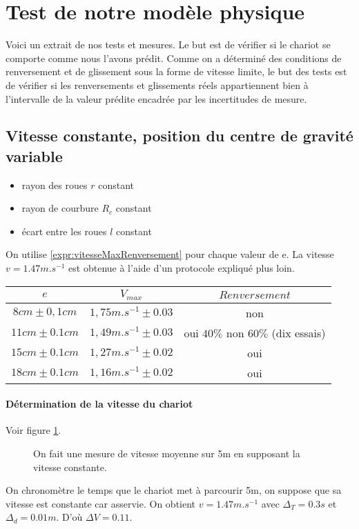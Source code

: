 \section{Test de notre modèle physique}
Voici un extrait de nos tests et mesures. Le but est de vérifier si le chariot se comporte comme nous l'avons prédit. Comme on a déterminé des conditions de renversement et de glissement sous la forme de vitesse limite, le but des tests est de vérifier si les renversements et glissements réels appartiennent bien à l'intervalle de la valeur prédite encadrée par les incertitudes de mesure.
\subsection{Vitesse constante, position du centre de gravité variable}
\begin{itemize}
	\item rayon des roues $r$ constant
	\item rayon de courbure $R_c$ constant
	\item écart entre les roues $l$ constant
\end{itemize}
On utilise \ref{expr:vitesseMaxRenversement} pour chaque valeur de e. La vitesse $v=1.47m.s^{-1}$ est obtenue à l'aide d'un protocole expliqué plus loin.\\
\begin{tabular}{c|c|c}
	$e$ & $V_{max}$ & $Renversement$\\
	\hline \hline
	$8cm\pm 0,1cm$ & $1,75m.s^{-1} \pm 0.03$ & non\\
	$11cm\pm 0.1cm$ & $1,49m.s^{-1} \pm 0.03$ & oui $40\%$ non $60\%$ (dix essais)\\
	$15cm\pm 0.1cm$ & $1,27m.s^{-1} \pm 0.02$ & oui\\
	$18cm\pm 0.1cm$ & $1,16m.s^{-1} \pm 0.02$ & oui
\end{tabular}
\paragraph{Détermination de la vitesse du chariot}
Voir figure \ref{fig:chariotChrono}.
\begin{figure}
	\centering

	\caption{On fait une mesure de vitesse moyenne sur 5m en supposant la vitesse constante.}
	\label{fig:chariotChrono}
\end{figure}
On chronomètre le temps que le chariot met à parcourir 5m, on suppose que sa vitesse est constante car asservie. On obtient $v=1.47m.s^{-1}$ avec $\Delta_T = 0.3s$ et $\Delta_d = 0.01m$. D'où $\Delta V = 0.11$.
